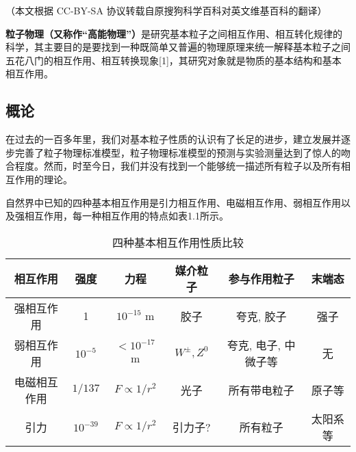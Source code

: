 
（本文根据 CC-BY-SA 协议转载自原搜狗科学百科对英文维基百科的翻译）


\textbf{粒子物理（又称作“高能物理”）}是研究基本粒子之间相互作用、相互转化规律的科学，其主要目的是要找到一种既简单又普遍的物理原理来统一解释基本粒子之间五花八门的相互作用、相互转换现象[1]，其研究对象就是物质的基本结构和基本相互作用。

\subsection{概论}
在过去的一百多年里，我们对基本粒子性质的认识有了长足的进步，建立发展并逐步完善了粒子物理标准模型，粒子物理标准模型的预测与实验测量达到了惊人的吻合程度。然而，时至今日，我们并没有找到一个能够统一描述所有粒子以及所有相互作用的理论。

自然界中已知的四种基本相互作用是引力相互作用、电磁相互作用、弱相互作用以及强相互作用，每一种相互作用的特点如表1.1所示。
\begin{table}[h]
\centering
\caption{四种基本相互作用性质比较}
\begin{tabular}{|c|c|c|c|c|c|}
\hline
\textbf{相互作用} & \textbf{强度} & \textbf{力程} & \textbf{媒介粒子} & \textbf{参与作用粒子} & \textbf{末端态 }\\
\hline
强相互作用 & 1 & $10^{-15}$ m & 胶子 & 夸克, 胶子 & 强子 \\
\hline
弱相互作用 & $10^{-5}$ & $<10^{-17}$ m & $W^{\pm}, Z^0$ & 夸克, 电子, 中微子等 & 无 \\
\hline
电磁相互作用 & $1/137$ & $F \propto 1/r^2$ & 光子 & 所有带电粒子 & 原子等 \\
\hline
引力 & $10^{-39}$ & $F \propto 1/r^2$ & 引力子? & 所有粒子 & 太阳系等 \\
\hline
\end{tabular}
\end{table}
